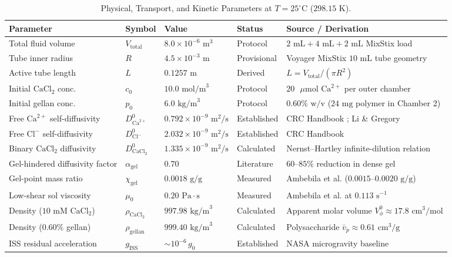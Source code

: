 \documentclass[11pt,twocolumn]{article}
\begin{document}
\begin{table}[t]
\centering
\caption{Physical, Transport, and Kinetic Parameters at $T = 25^\circ\text{C}$ ($298.15\text{ K}$).}
\label{tab:params}
\begin{tabularx}{\textwidth}{@{}l l l l X@{}}
\toprule
\textbf{Parameter} & \textbf{Symbol} & \textbf{Value} & \textbf{Status} & \textbf{Source / Derivation} \\
\midrule
Total fluid volume & $V_{\text{total}}$ & $8.0 \times 10^{-6}\text{ m}^3$ & Protocol & $2\text{ mL} + 4\text{ mL} + 2\text{ mL}$ MixStix load \\
Tube inner radius & $R$ & $4.5 \times 10^{-3}\text{ m}$ & Provisional & Voyager MixStix $10\text{ mL}$ tube geometry \cite{voyager2026} \\
Active tube length & $L$ & $0.1257\text{ m}$ & Derived & $L = V_{\text{total}} / (\pi R^2)$ \\
Initial $\text{CaCl}_2$ conc. & $c_0$ & $10.0\text{ mol/m}^3$ & Protocol & $20\text{ }\mu\text{mol Ca}^{2+}$ per outer chamber \\
Initial gellan conc. & $p_0$ & $6.0\text{ kg/m}^3$ & Protocol & $0.60\%\text{ w/v}$ ($24\text{ mg}$ polymer in Chamber 2) \\
Free $\text{Ca}^{2+}$ self-diffusivity & $D_{\text{Ca}^{2+}}^0$ & $0.792 \times 10^{-9}\text{ m}^2/\text{s}$ & Established & CRC Handbook \cite{haynes2012}; Li \& Gregory \cite{ligregory1974} \\
Free $\text{Cl}^-$ self-diffusivity & $D_{\text{Cl}^-}^0$ & $2.032 \times 10^{-9}\text{ m}^2/\text{s}$ & Established & CRC Handbook \cite{haynes2012} \\
Binary $\text{CaCl}_2$ diffusivity & $D_{\text{CaCl}_2}^0$ & $1.335 \times 10^{-9}\text{ m}^2/\text{s}$ & Calculated & Nernst--Hartley infinite-dilution relation \\
Gel-hindered diffusivity factor & $\alpha_{\text{gel}}$ & $0.70$ & Literature & $60\text{--}85\%$ reduction in dense gel \cite{mammarella2003} \\
Gel-point mass ratio & $\chi_{\text{gel}}$ & $0.0018\text{ g/g}$ & Measured & Ambebila et al. ($0.0015\text{--}0.0020\text{ g/g}$) \cite{ambebila2019} \\
Low-shear sol viscosity & $\mu_0$ & $0.20\text{ Pa}\cdot\text{s}$ & Measured & Ambebila et al. at $0.113\text{ s}^{-1}$ \cite{ambebila2019} \\
Density ($10\text{ mM CaCl}_2$) & $\rho_{\text{CaCl}_2}$ & $997.98\text{ kg/m}^3$ & Calculated & Apparent molar volume $V_\phi^0 \approx 17.8\text{ cm}^3/\text{mol}$ \\
Density ($0.60\%$ gellan) & $\rho_{\text{gellan}}$ & $999.40\text{ kg/m}^3$ & Calculated & Polysaccharide $\bar{v}_p \approx 0.61\text{ cm}^3/\text{g}$ \\
ISS residual acceleration & $g_{\text{ISS}}$ & $\sim 10^{-6}\,g_0$ & Established & NASA microgravity baseline \cite{nasa2024} \\
\bottomrule
\end{tabularx}
\end{table}
\end{document}
